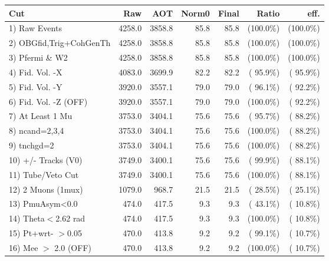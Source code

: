  \begin{table}[h!]\centering
 \begin{tabular}{||l||r|r|r|r|r|r||}
 \hline
 \hline
 Cut & Raw & AOT & Norm0 & Final & Ratio & eff.       \\
 \hline
  1) Raw Events           &       4258.0 &       3858.8 &         85.8 &         85.8 & (100.0\%) & (100.0\%) \\
  2) OBGfid,Trig+CohGenTh &       4258.0 &       3858.8 &         85.8 &         85.8 & (100.0\%) & (100.0\%) \\
  3) Pfermi \& W2         &       4258.0 &       3858.8 &         85.8 &         85.8 & (100.0\%) & (100.0\%) \\
  4) Fid. Vol. -X         &       4083.0 &       3699.9 &         82.2 &         82.2 & ( 95.9\%) & ( 95.9\%) \\
  5) Fid. Vol. -Y         &       3920.0 &       3557.1 &         79.0 &         79.0 & ( 96.1\%) & ( 92.2\%) \\
  6) Fid. Vol. -Z (OFF)   &       3920.0 &       3557.1 &         79.0 &         79.0 & (100.0\%) & ( 92.2\%) \\
  7) At Least 1 Mu        &       3753.0 &       3404.1 &         75.6 &         75.6 & ( 95.7\%) & ( 88.2\%) \\
  8) ncand=2,3,4          &       3753.0 &       3404.1 &         75.6 &         75.6 & (100.0\%) & ( 88.2\%) \\
  9) tnchgd=2             &       3753.0 &       3404.1 &         75.6 &         75.6 & (100.0\%) & ( 88.2\%) \\
 10) +/- Tracks (V0)      &       3749.0 &       3400.1 &         75.6 &         75.6 & ( 99.9\%) & ( 88.1\%) \\
 11) Tube/Veto Cut        &       3749.0 &       3400.1 &         75.6 &         75.6 & (100.0\%) & ( 88.1\%) \\
 12) 2 Muons (1mux)       &       1079.0 &        968.7 &         21.5 &         21.5 & ( 28.5\%) & ( 25.1\%) \\
 13) PmuAsym<0.0          &        474.0 &        417.5 &          9.3 &          9.3 & ( 43.1\%) & ( 10.8\%) \\
 14) Theta$<$2.62 rad     &        474.0 &        417.5 &          9.3 &          9.3 & (100.0\%) & ( 10.8\%) \\
 15) Pt+wrt- $>$0.05      &        470.0 &        413.8 &          9.2 &          9.2 & ( 99.1\%) & ( 10.7\%) \\
 16) Mee $>$ 2.0  (OFF)   &        470.0 &        413.8 &          9.2 &          9.2 & (100.0\%) & ( 10.7\%) \\

\end{tabular}
\end{table}
